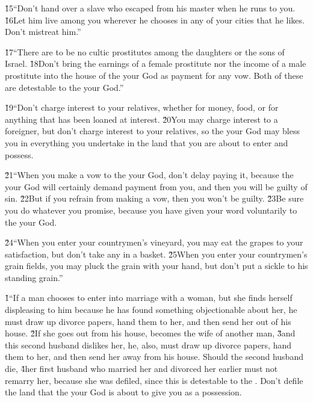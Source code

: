 \v{15}``Don't hand over a slave who escaped from his master when he runs to you. \v{16}Let him live among you wherever he chooses in any of your cities that he likes. Don't mistreat him.''

\v{17}``There are to be no cultic prostitutes among the daughters or the sons of Israel. \v{18}Don't bring the earnings of a female prostitute nor the income of a male prostitute into the house of the  your God as payment for any vow. Both of these are detestable to the  your God.''

\v{19}``Don't charge interest to your relatives, whether for money, food, or for anything that has been loaned at interest. \v{20}You may charge interest to a foreigner, but don't charge interest to your relatives, so the  your God may bless you in everything you undertake in the land that you are about to enter and possess.

\v{21}``When you make a vow to the  your God, don't delay paying it, because the  your God will certainly demand payment from you, and then you will be guilty of sin. \v{22}But if you refrain from making a vow, then you won't be guilty. \v{23}Be sure you do whatever you promise, because you have given your word voluntarily to the  your God.

\v{24}``When you enter your countrymen's vineyard, you may eat the grapes to your satisfaction, but don't take any in a basket. \v{25}When you enter your countrymen's grain fields, you may pluck the grain with your hand, but don't put a sickle to his standing grain.''

\v{1}``If a man chooses to enter into marriage with a woman, but she finds herself displeasing to him because he has found something objectionable about her, he must draw up divorce papers, hand them to her, and then send her out of his house. \v{2}If she goes out from his house, becomes the wife of another man, \v{3}and this second husband dislikes her, he, also, must draw up divorce papers, hand them to her, and then send her away from his house. Should the second husband die, \v{4}her first husband who married her and divorced her earlier must not remarry her, because she was defiled, since this is detestable to the . Don't defile the land that the  your God is about to give you as a possession.

